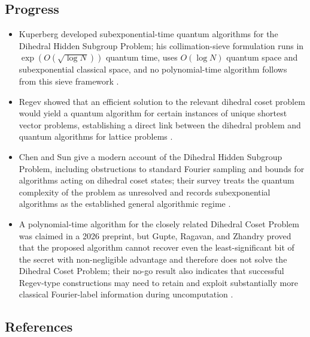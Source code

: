 \subsection*{Progress}

\begin{itemize}
  \item Kuperberg developed subexponential-time quantum algorithms for the
Dihedral Hidden Subgroup Problem; his collimation-sieve formulation runs in
$\exp(O(\sqrt{\log N}))$ quantum time, uses $O(\log N)$ quantum space and
subexponential classical space, and no polynomial-time algorithm follows
from this sieve framework
.

  \item Regev showed that an efficient solution to the relevant dihedral coset
problem would yield a quantum algorithm for certain instances of unique
shortest vector problems, establishing a direct link between the dihedral
problem and quantum algorithms for lattice problems
.

  \item Chen and Sun give a modern account of the Dihedral Hidden Subgroup
Problem, including obstructions to standard Fourier sampling and bounds for
algorithms acting on dihedral coset states; their survey treats the
quantum complexity of the problem as unresolved and records subexponential
algorithms as the established general algorithmic regime
.

  \item A polynomial-time algorithm for the closely related Dihedral Coset
Problem was claimed in a 2026 preprint, but Gupte, Ragavan, and Zhandry
proved that the proposed algorithm cannot recover even the least-significant
bit of the secret with non-negligible advantage and therefore does not solve
the Dihedral Coset Problem; their no-go result also indicates that
successful Regev-type constructions may need to retain and exploit
substantially more classical Fourier-label information during uncomputation
.
\end{itemize}

\subsection*{References}

